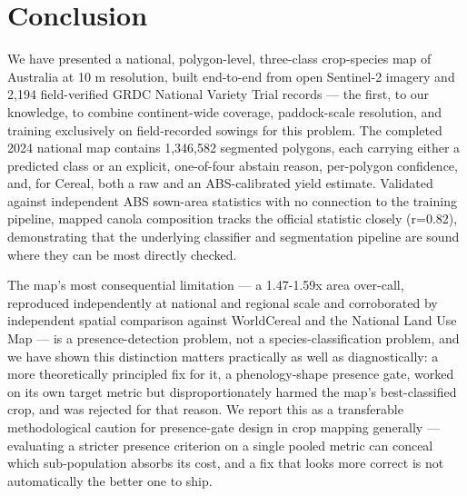 
\section{Conclusion}\label{conclusion}

We have presented a national, polygon-level, three-class crop-species map of Australia at 10 m resolution, built end-to-end from open Sentinel-2 imagery and 2,194 field-verified GRDC National Variety Trial records --- the first, to our knowledge, to combine continent-wide coverage, paddock-scale resolution, and training exclusively on field-recorded sowings for this problem. The completed 2024 national map contains 1,346,582 segmented polygons, each carrying either a predicted class or an explicit, one-of-four abstain reason, per-polygon confidence, and, for Cereal, both a raw and an ABS-calibrated yield estimate. Validated against independent ABS sown-area statistics with no connection to the training pipeline, mapped canola composition tracks the official statistic closely (r=0.82), demonstrating that the underlying classifier and segmentation pipeline are sound where they can be most directly checked.

The map's most consequential limitation --- a 1.47-1.59x area over-call, reproduced independently at national and regional scale and corroborated by independent spatial comparison against WorldCereal and the National Land Use Map --- is a presence-detection problem, not a species-classification problem, and we have shown this distinction matters practically as well as diagnostically: a more theoretically principled fix for it, a phenology-shape presence gate, worked on its own target metric but disproportionately harmed the map's best-classified crop, and was rejected for that reason. We report this as a transferable methodological caution for presence-gate design in crop mapping generally --- evaluating a stricter presence criterion on a single pooled metric can conceal which sub-population absorbs its cost, and a fix that looks more correct is not automatically the better one to ship.

